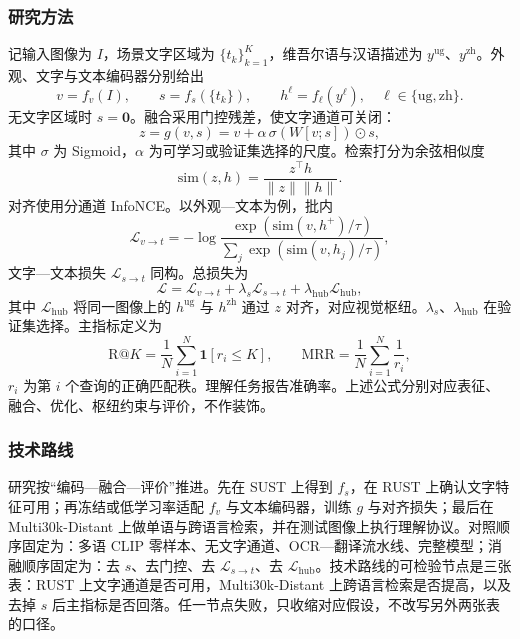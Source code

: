 \justifying
\NSFCBodyText

\subsubsection{研究方法}

记输入图像为 $I$，场景文字区域为 $\{t_k\}_{k=1}^{K}$，维吾尔语与汉语描述为 $y^{\mathrm{ug}}$、$y^{\mathrm{zh}}$。外观、文字与文本编码器分别给出
\begin{equation}
v=f_v(I),\qquad
s=f_s(\{t_k\}),\qquad
h^{\ell}=f_{\ell}(y^{\ell}),\quad \ell\in\{\mathrm{ug},\mathrm{zh}\}.
\end{equation}
无文字区域时 $s=\mathbf{0}$。融合采用门控残差，使文字通道可关闭：
\begin{equation}
z=g(v,s)=v+\alpha\,\sigma\!\left(W[v;s]\right)\odot s,
\end{equation}
其中 $\sigma$ 为 Sigmoid，$\alpha$ 为可学习或验证集选择的尺度。检索打分为余弦相似度
\begin{equation}
\mathrm{sim}(z,h)=\frac{z^{\top}h}{\|z\|\|h\|}.
\end{equation}
对齐使用分通道 InfoNCE\cite{oord2018representation}。以外观—文本为例，批内
\begin{equation}
\mathcal{L}_{v\rightarrow t}=-\log\frac{\exp(\mathrm{sim}(v,h^{+})/\tau)}{\sum_{j}\exp(\mathrm{sim}(v,h_j)/\tau)},
\end{equation}
文字—文本损失 $\mathcal{L}_{s\rightarrow t}$ 同构。总损失为
\begin{equation}
\mathcal{L}=\mathcal{L}_{v\rightarrow t}+\lambda_s\mathcal{L}_{s\rightarrow t}+\lambda_{\mathrm{hub}}\mathcal{L}_{\mathrm{hub}},
\end{equation}
其中 $\mathcal{L}_{\mathrm{hub}}$ 将同一图像上的 $h^{\mathrm{ug}}$ 与 $h^{\mathrm{zh}}$ 通过 $z$ 对齐，对应视觉枢纽。$\lambda_s$、$\lambda_{\mathrm{hub}}$ 在验证集选择。主指标定义为
\begin{equation}
\mathrm{R@}K=\frac{1}{N}\sum_{i=1}^{N}\mathbf{1}[r_i\le K],\qquad
\mathrm{MRR}=\frac{1}{N}\sum_{i=1}^{N}\frac{1}{r_i},
\end{equation}
$r_i$ 为第 $i$ 个查询的正确匹配秩。理解任务报告准确率。上述公式分别对应表征、融合、优化、枢纽约束与评价，不作装饰。

\subsubsection{技术路线}

研究按“编码—融合—评价”推进。先在 SUST 上得到 $f_s$，在 RUST 上确认文字特征可用；再冻结或低学习率适配 $f_v$ 与文本编码器，训练 $g$ 与对齐损失；最后在 Multi30k-Distant 上做单语与跨语言检索，并在测试图像上执行理解协议。对照顺序固定为：多语 CLIP 零样本、无文字通道、OCR—翻译流水线、完整模型；消融顺序固定为：去 $s$、去门控、去 $\mathcal{L}_{s\rightarrow t}$、去 $\mathcal{L}_{\mathrm{hub}}$。技术路线的可检验节点是三张表：RUST 上文字通道是否可用，Multi30k-Distant 上跨语言检索是否提高，以及去掉 $s$ 后主指标是否回落。任一节点失败，只收缩对应假设，不改写另外两张表的口径。


